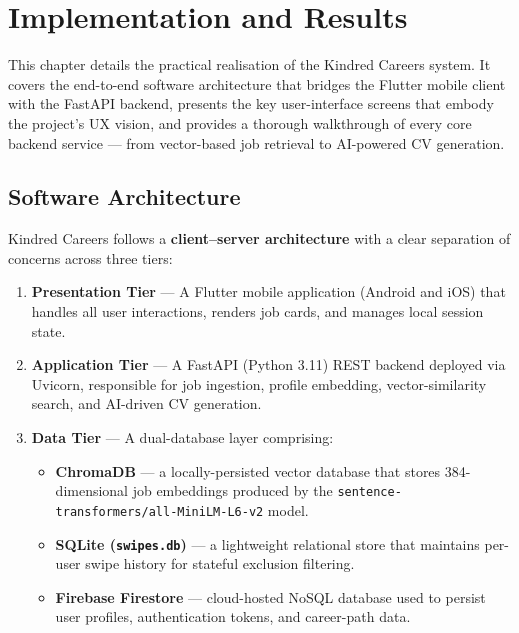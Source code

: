 \documentclass[12pt, a4paper, oneside]{report}
\begin{document}
\chapter{Implementation and Results}

This chapter details the practical realisation of the Kindred Careers system. It covers the
end-to-end software architecture that bridges the Flutter mobile client with the FastAPI
backend, presents the key user-interface screens that embody the project's UX vision, and
provides a thorough walkthrough of every core backend service — from vector-based job retrieval
to AI-powered CV generation.

\section{Software Architecture}
\label{sec:software-architecture}

Kindred Careers follows a \textbf{client–server architecture} with a clear separation of
concerns across three tiers:

\begin{enumerate}[label=\textbf{\arabic*.}, leftmargin=*, itemsep=4pt]
  \item \textbf{Presentation Tier} — A Flutter mobile application (Android and iOS) that handles
        all user interactions, renders job cards, and manages local session state.
  \item \textbf{Application Tier} — A FastAPI (Python 3.11) REST backend deployed via
        Uvicorn, responsible for job ingestion, profile embedding, vector-similarity search,
        and AI-driven CV generation.
  \item \textbf{Data Tier} — A dual-database layer comprising:
        \begin{itemize}[itemsep=2pt]
          \item \textbf{ChromaDB} — a locally-persisted vector database that stores 384-dimensional
                job embeddings produced by the \texttt{sentence-transformers/all-MiniLM-L6-v2} model.
          \item \textbf{SQLite (\texttt{swipes.db})} — a lightweight relational store that maintains
                per-user swipe history for stateful exclusion filtering.
          \item \textbf{Firebase Firestore} — cloud-hosted NoSQL database used to persist user
                profiles, authentication tokens, and career-path data.
        \end{itemize}
\end{enumerate}
\end{document}
